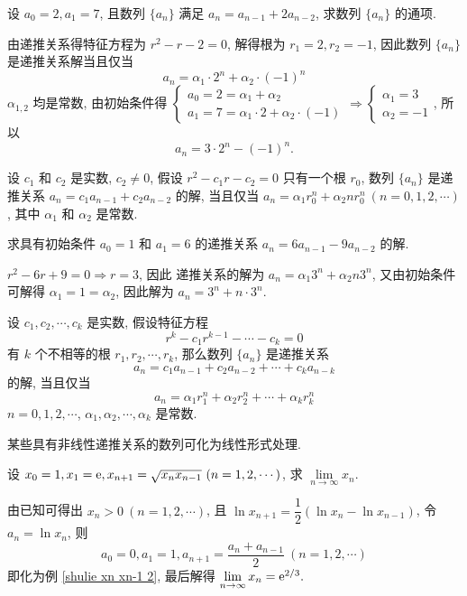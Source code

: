 \begin{example}
    设 $a_0=2,a_1=7$, 且数列 $\{a_n\}$ 满足 $a_n=a_{n-1}+2a_{n-2}$, 求数列 $\{a_n\}$ 的通项.
\end{example}
\begin{solution}
    由递推关系得特征方程为 $r^2-r-2=0$, 解得根为 $r_1=2,r_2=-1$, 因此数列 $\{a_n\}$ 是递推关系解当且仅当
    $$a_n=\alpha_1\cdot 2^n+\alpha_2\cdot(-1)^n$$
    $\alpha_{1,2}$ 均是常数, 由初始条件得 $\displaystyle\begin{cases}a_{0}=2=\alpha _{1}+\alpha _{2} \\
            a_{1}=7=\alpha _{1}\cdot 2+\alpha _{2}\cdot \left( -1\right)\end{cases}\Rightarrow\begin{cases}
            \alpha_1=3 \\ \alpha_2=-1
        \end{cases}$, 所以 $$a_n=3\cdot 2^n-(-1)^n.$$
\end{solution}
\begin{theorem}
    设 $c_1$ 和 $c_2$ 是实数, $c_2\not=0$, 假设 $r^2-c_1r-c_2=0$ 只有一个根 $r_0$, 数列 $\{a_n\}$ 是递推关系 $a_n=c_1a_{n-1}+c_2a_{n-2}$ 的解, 
    当且仅当 $a_n=\alpha_1r_0^n+\alpha_2nr_0^n~  (n=0,1,2,\cdots)$, 其中 $\alpha_1$ 和 $\alpha_2$ 是常数.
\end{theorem}
\begin{example}
    求具有初始条件 $a_0=1$ 和 $a_1=6$ 的递推关系 $a_n=6a_{n-1}-9a_{n-2}$ 的解.
\end{example}
\begin{solution}
    $r^2-6r+9=0\Rightarrow r=3$, 因此 递推关系的解为 $a_n=\alpha_1 3^n+\alpha_2 n3^n$, 
    又由初始条件可解得 $\alpha_1=1=\alpha_2$, 因此解为 $a_n=3^n+n\cdot 3^n.$
\end{solution}
\begin{theorem}
    设 $c_1,c_2,\cdots,c_k$ 是实数, 假设特征方程 $$r^k-c_1r^{k-1}-\cdots-c_k=0$$
    有 $k$ 个不相等的根 $r_1,r_2,\cdots,r_k$, 那么数列 $\{a_n\}$ 是递推关系
    $$a_n=c_1a_{n-1}+c_2a_{n-2}+\cdots+c_ka_{n-k}$$
    的解, 当且仅当 $$a_{n}=\alpha _{1}r_{1}^{n}+\alpha _{2}r_{2}^{n}+\cdots +\alpha _{k}r_{k}^{n}$$
    $n=0,1,2,\cdots$, $\alpha_1,\alpha_2,\cdots,\alpha_k$ 是常数.
\end{theorem}

某些具有非线性递推关系的数列可化为线性形式处理.
\begin{example}
    设 $x_0=1,x_1=\mathrm{e} ,x_{n+1}=\sqrt{x_n x_{n-1}}~  (n=1,2,\cdots)$, 求 $\lim\limits_{n\to\infty}x_n.$
\end{example}
\begin{solution}
    由已知可得出 $x_n>0~  (n=1,2,\cdots)$, 且 $\ln x_{n+1}=\dfrac{1}{2}(\ln x_n-\ln x_{n-1})$, 
    令 $a_n=\ln x_n$, 则 $$a_0=0,a_1=1,a_{n+1}=\dfrac{a_n+a_{n-1}}{2}~  (n=1,2,\cdots)$$
    即化为例 \ref{shulie xn xn-1 2}, 最后解得 $\lim\limits_{n\to\infty}x_n=\mathrm{e} ^{2/3}.$
\end{solution}

